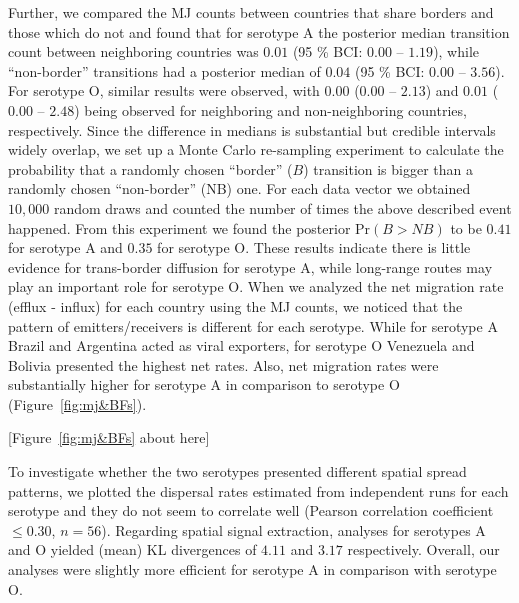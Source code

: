 \documentclass[10pt]{article}
\begin{document}
Further, we compared the MJ counts between countries that share borders and those which do not and found that for serotype A the posterior median transition count between neighboring countries was $0.01$ (95 \% BCI: $0.00$ -- $1.19$), while ``non-border'' transitions had a posterior median of $0.04$ (95 \% BCI: $0.00$ --  $3.56$).
For serotype O, similar results were observed, with $0.00$ ($0.00$ -- $2.13$) and $0.01$ ($0.00$ -- $2.48$) being observed for neighboring and non-neighboring countries, respectively.
Since the difference in medians is substantial but credible intervals widely overlap, we set up a Monte Carlo re-sampling experiment to calculate the probability that a randomly chosen ``border'' ($B$) transition is bigger than a randomly chosen ``non-border'' (NB) one.
For each data vector we obtained $10,000$ random draws and counted the number of times the above described event happened.
From this experiment we found the posterior $\mbox{Pr}(B>NB)$  to be $0.41$ for serotype A and $0.35$ for serotype O.
These results indicate there is little evidence for trans-border diffusion for serotype A, while long-range routes may play an important role for serotype O.
When we analyzed the net migration rate (efflux - influx) for each country using the MJ counts, we noticed that the pattern of emitters/receivers is different for each serotype.
While for serotype A Brazil and Argentina acted as viral exporters, for serotype O Venezuela and Bolivia presented the highest net rates.
Also, net migration rates were substantially higher for serotype A in comparison to serotype O (Figure~\ref{fig:mj&BFs}).

\begin{center}
 [Figure~\ref{fig:mj&BFs} about here]
\end{center}

To investigate whether the two serotypes presented different spatial spread patterns, we plotted the dispersal rates estimated from independent runs for each serotype and they do not seem to correlate well (Pearson correlation coefficient $\leq 0.30$, $n = 56$).
Regarding spatial signal extraction, analyses for serotypes  A and O yielded (mean) KL divergences of $4.11$ and $3.17$ respectively.
Overall, our analyses were slightly more efficient for serotype A in comparison with serotype O.
\end{document}
